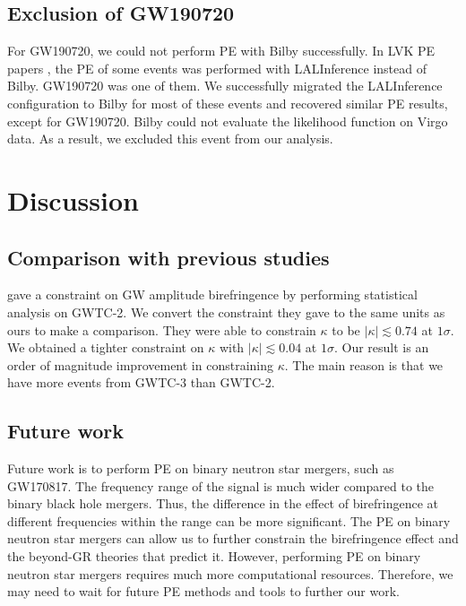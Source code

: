 \documentclass[aps,prd,twocolumn,superscriptaddress,preprintnumbers,floatfix,nofootinbib]{revtex4-2}
\begin{document}
\subsection{Exclusion of GW190720}
\label{sec:GW190720}
For GW190720, we could not perform PE with Bilby successfully.
In LVK PE papers \citep{GWTC-2.1, GWTC-3}, the PE of some events was performed with LALInference \citep{lalsuite} instead of Bilby.
GW190720 was one of them.
We successfully migrated the LALInference configuration to Bilby for most of these events and recovered similar PE results, except for GW190720.
Bilby could not evaluate the likelihood function on Virgo data.
As a result, we excluded this event from our analysis.

\section{Discussion}
\label{sec:Discussion}

\subsection{Comparison with previous studies}
\citet{Okounkova_2022} gave a constraint on GW amplitude birefringence by performing statistical analysis on GWTC-2.
We convert the constraint they gave to the same units as ours to make a comparison.
They were able to constrain $\kappa$ to be $|\kappa| \lesssim 0.74$ at $1 \sigma$.
We obtained a tighter constraint on $\kappa$ with $|\kappa| \lesssim 0.04$ at $1 \sigma$.
Our result is an order of magnitude improvement in constraining $\kappa$.
The main reason is that we have more events from GWTC-3 than GWTC-2.


\subsection{Future work}
Future work is to perform PE on binary neutron star mergers, such as GW170817.
The frequency range of the signal is much wider compared to the binary black hole mergers.
Thus, the difference in the effect of birefringence at different frequencies within the range can be more significant.
The PE on binary neutron star mergers can allow us to further constrain the birefringence effect and the beyond-GR theories that predict it.
However, performing PE on binary neutron star mergers requires much more computational resources.
Therefore, we may need to wait for future PE methods and tools to further our work.
\end{document}
